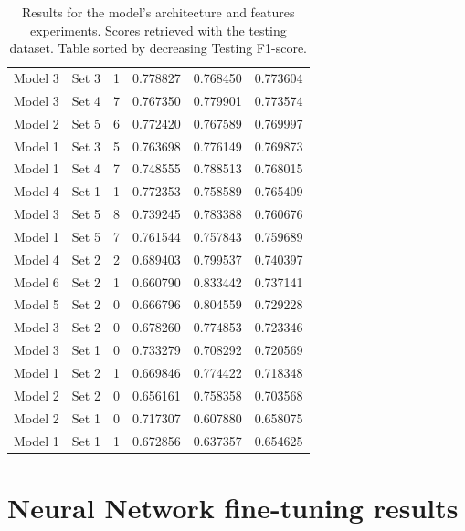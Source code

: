 \begin{table}[htbp]
\begin{tabular}{c|c|c|c|c|c}
        Model 3  &	Set 3      &	1	    &	0.778827    &	0.768450    &	0.773604    \\
        Model 3  &	Set 4      &	7	    &	0.767350    &	0.779901    &	0.773574    \\
        Model 2  &	Set 5      &	6	    &	0.772420    &	0.767589    &	0.769997    \\
        Model 1  &	Set 3      &	5	    &	0.763698    &	0.776149    &	0.769873    \\
        Model 1  &	Set 4      &	7	    &	0.748555    &	0.788513    &	0.768015    \\
        Model 4  &	Set 1      &	1	    &	0.772353    &	0.758589    &	0.765409    \\
        Model 3  &	Set 5      &	8	    &	0.739245    &	0.783388    &	0.760676    \\
        Model 1  &	Set 5      &	7	    &	0.761544    &	0.757843    &	0.759689    \\
        Model 4  &	Set 2      &	2	    &	0.689403    &	0.799537    &	0.740397    \\
        Model 6  &	Set 2      &	1	    &	0.660790    &	0.833442    &	0.737141    \\
        Model 5  &	Set 2      &	0	    &	0.666796    &	0.804559    &	0.729228    \\
        Model 3  &	Set 2      &	0	    &	0.678260    &	0.774853    &	0.723346    \\
        Model 3  &	Set 1      &	0	    &	0.733279    &	0.708292    &	0.720569    \\
        Model 1  &	Set 2      &	1	    &	0.669846    &	0.774422    &	0.718348    \\
        Model 2  &	Set 2      &	0	    &	0.656161    &	0.758358    &	0.703568    \\
        Model 2  &	Set 1      &	0	    &	0.717307    &	0.607880    &	0.658075    \\
        Model 1  &	Set 1      &	1	    &	0.672856    &	0.637357    &	0.654625    \\
    \end{tabular}
    \caption{Results for the model's architecture and features experiments. Scores retrieved with the testing dataset. Table sorted by decreasing Testing F1-score.}
    \label{tab-annex:nn-experiments}
\end{table}




\chapter{Neural Network fine-tuning results}
\label{annex:nn-fine-tuning}

